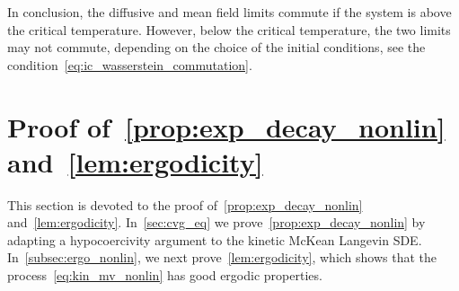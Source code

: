 \documentclass[onefignum,onetabnum]{siamart251216} %
\theoremstyle{plain}
\numberwithin{equation}{section}
\numberwithin{theorem}{section}
\begin{document}
In conclusion, the diffusive and mean field limits commute if the system is above the critical temperature. However, below the critical temperature, the two limits may not commute, depending on the choice of the initial conditions, see the condition~\eqref{eq:ic_wasserstein_commutation}.
%
%
\section{Proof of~\texorpdfstring{\cref{prop:exp_decay_nonlin}}{Proposition~\ref{prop:exp_decay_nonlin}} and~\texorpdfstring{\cref{lem:ergodicity}}{Lemma~\ref{lem:ergodicity}}}
\label{sec:proof_cvg_eq_ergo}
This section is devoted to the proof of~\cref{prop:exp_decay_nonlin} and~\cref{lem:ergodicity}.
In~\cref{sec:cvg_eq} we prove~\cref{prop:exp_decay_nonlin} by adapting a hypocoercivity argument to the kinetic McKean Langevin SDE. In~\cref{subsec:ergo_nonlin}, we next prove~\cref{lem:ergodicity}, which shows that the process~\eqref{eq:kin_mv_nonlin} has good ergodic properties.
%
%
\end{document}
